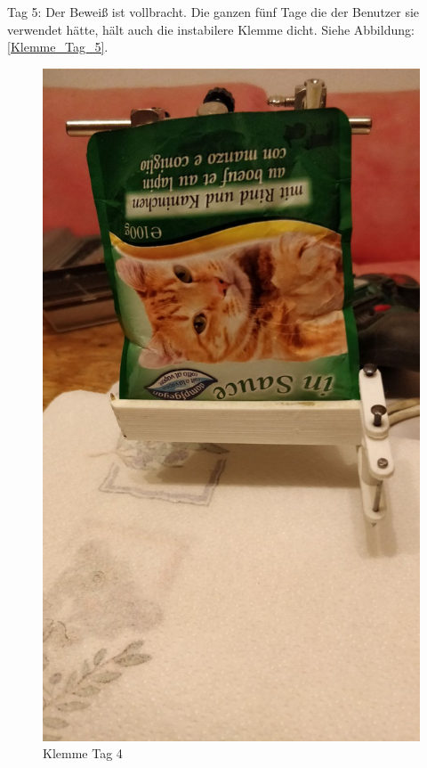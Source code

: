 Tag 5: Der Beweiß ist vollbracht. Die ganzen fünf Tage die der Benutzer sie verwendet hätte, hält auch die instabilere Klemme dicht. Siehe Abbildung: \ref{Klemme_Tag_5}.

\begin{figure}[H]
   \begin{minipage}[hbt]{.3\linewidth} %
      \includegraphics[width=\linewidth]{Bilder/Dichtheitsexperiment/Tag_4}
      \caption{Klemme Tag 4}
      \label{Klemme_Tag_4} 

\end{minipage}
\end{figure}
